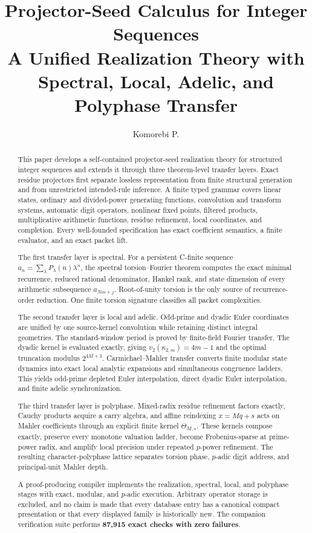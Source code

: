 \documentclass[11pt]{article}
\title{\textbf{Projector-Seed Calculus for Integer Sequences}\\[.55em]\large A Unified Realization Theory with Spectral, Local, Adelic, and Polyphase Transfer}
\author{Komorebi P.}\date{}
\theoremstyle{definition}\newtheorem{definition}[theorem]{Definition}\newtheorem{example}[theorem]{Example}\newtheorem{construction}[theorem]{Construction}\newtheorem{algorithm}[theorem]{Algorithm}\newtheorem{conjecture}[theorem]{Conjecture}\newtheorem{problem}[theorem]{Problem}
\theoremstyle{remark}\newtheorem{remark}[theorem]{Remark}\newtheorem{boundary}[theorem]{Boundary}\newtheorem{certificate}[theorem]{Computational Certificate}\newtheorem{classical}[theorem]{Classical Input}\newtheorem{principle}[theorem]{Structural Principle}
\begin{document}
\maketitle
\begin{abstract}
This paper develops a self-contained projector-seed realization theory for structured integer sequences and extends it through three theorem-level transfer layers. Exact residue projectors first separate lossless representation from finite structural generation and from unrestricted intended-rule inference. A finite typed grammar covers linear states, ordinary and divided-power generating functions, convolution and transform systems, automatic digit operators, nonlinear fixed points, filtered products, multiplicative arithmetic functions, residue refinement, local coordinates, and completion. Every well-founded specification has exact coefficient semantics, a finite evaluator, and an exact packet lift.

The first transfer layer is spectral. For a persistent C-finite sequence $a_n=\sum_\lambda P_\lambda(n)\lambda^n$, the spectral torsion--Fourier theorem computes the exact minimal recurrence, reduced rational denominator, Hankel rank, and state dimension of every arithmetic subsequence $a_{Nm+j}$. Root-of-unity torsion is the only source of recurrence-order reduction. One finite torsion signature classifies all packet complexities.

The second transfer layer is local and adelic. Odd-prime and dyadic Euler coordinates are unified by one source-kernel convolution while retaining distinct integral geometries. The standard-window period is proved by finite-field Fourier transfer. The dyadic kernel is evaluated exactly, giving $v_2(\kappa_{2,m})=4m-1$ and the optimal truncation modulus $2^{4M+3}$. Carmichael--Mahler transfer converts finite modular state dynamics into exact local analytic expansions and simultaneous congruence ladders. This yields odd-prime depleted Euler interpolation, direct dyadic Euler interpolation, and finite adelic synchronization.

The third transfer layer is polyphase. Mixed-radix residue refinement factors exactly, Cauchy products acquire a carry algebra, and affine reindexing $x=Mq+s$ acts on Mahler coefficients through an explicit finite kernel $\Theta_{M,s}$. These kernels compose exactly, preserve every monotone valuation ladder, become Frobenius-sparse at prime-power radix, and amplify local precision under repeated $p$-power refinement. The resulting character-polyphase lattice separates torsion phase, $p$-adic digit address, and principal-unit Mahler depth.

A proof-producing compiler implements the realization, spectral, local, and polyphase stages with exact, modular, and $p$-adic execution. Arbitrary operator storage is excluded, and no claim is made that every database entry has a canonical compact presentation or that every displayed family is historically new. The companion verification suite performs \textbf{87{,}915 exact checks with zero failures}.
\end{abstract}
\end{document}
